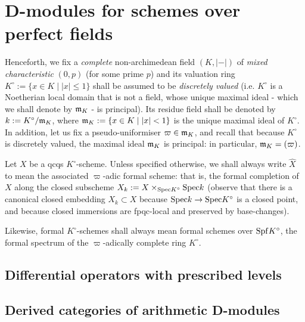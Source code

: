 \section{D-modules for schemes over perfect fields}
    \begin{convention} \label{conv: arithmetic_D_modules_for_schemes_over_perfect_fields_general_conventions}
        Henceforth, we fix a \textit{complete} non-archimedean field $(K, |-|)$ of \textit{mixed characteristic} $(0, p)$ (for some prime $p$) and its valuation ring $K^{\circ} := \{x \in K \mid |x| \leq 1\}$ shall be assumed to be \textit{discretely valued} (i.e. $K^{\circ}$ is a Noetherian local domain that is not a field, whose unique maximal ideal - which we shall denote by $\mathfrak{m}_K$ - is principal). Its residue field shall be denoted by $k := K^{\circ}/\mathfrak{m}_K$, where $\mathfrak{m}_K := \{x \in K \mid |x| < 1\}$ is the unique maximal ideal of $K^{\circ}$. In addition, let us fix a pseudo-uniformiser $\varpi \in \mathfrak{m}_K$, and recall that because $K^{\circ}$ is discretely valued, the maximal ideal $\mathfrak{m}_K$ is principal: in particular, $\mathfrak{m}_K = (\varpi)$.
    \end{convention}
    \begin{convention}
        Let $X$ be a qcqs $K^{\circ}$-scheme. Unless specified otherwise, we shall always write $\hat{X}$ to mean the associated $\varpi$-adic formal scheme: that is, the formal completion of $X$ along the closed subscheme $X_k := X \x_{\Spec K^{\circ}} \Spec k$ (observe that there is a canonical closed embedding $X_k \subset X$ because $\mathrm{Spec} k \to \mathrm{Spec} K^{\circ}$ is a closed point, and because closed immersions are fpqc-local and preserved by base-changes). 
        
        Likewise, formal $K^{\circ}$-schemes shall always mean formal schemes over $\mathrm{Spf} K^{\circ}$, the formal spectrum of the $\varpi$-adically complete ring $K^{\circ}$.
    \end{convention}
    
    \subsection{Differential operators with prescribed levels}
    
    \subsection{Derived categories of arithmetic D-modules}